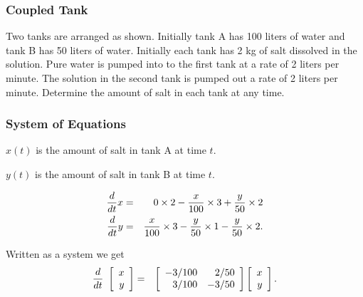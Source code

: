 \begin{frame}
  \frametitle{Coupled Tank}


  Two tanks are arranged as shown. Initially tank A has 100 liters of
  water and tank B has 50 liters of water. Initially each tank has 2
  kg of salt dissolved in the solution. Pure water is pumped into to
  the first tank at a rate of 2 liters per minute. The solution in the
  second tank is pumped out a rate of 2 liters per minute. Determine
  the amount of salt in each tank at any time.
  
\end{frame}


\begin{frame}
  \frametitle{System of Equations}

  $x(t)$ is the amount of salt in tank A at time $t$.

  $y(t)$ is the amount of salt in tank B at time $t$.

  \begin{eqnarray*}
    \deriv{x}{t} & = & 0\times 2 - 
    \frac{x}{100}\times 3 + \frac{y}{50}\times 2 \\
    \deriv{y}{t} & = & \frac{x}{100} \times 3 -
    \frac{y}{50} \times 1 - \frac{y}{50}\times 2.
  \end{eqnarray*}

  Written as a system we get
  \begin{eqnarray*}
    \deriv{~}{t} \vecTwo{x}{y} & = & 
    \arrayTwo{-3/100}{2/50}{3/100}{-3/50} \vecTwo{x}{y}.
  \end{eqnarray*}
  
\end{frame}


